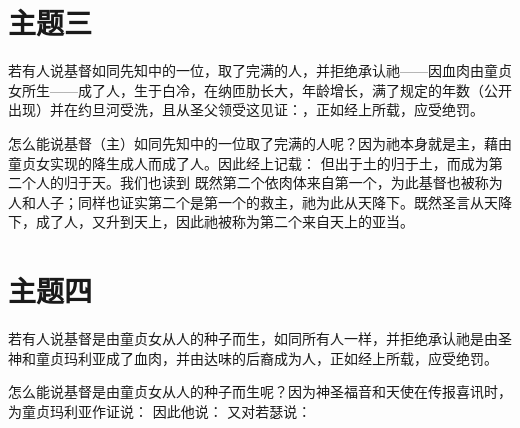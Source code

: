 
\section{主题三}

若有人说基督如同先知中的一位，取了完满的人，并拒绝承认祂——因血肉由童贞女所生——成了人，生于白冷，在纳匝肋长大，年龄增长，满了规定的年数（公开出现）并在约旦河受洗，且从圣父领受这见证：，正如经上所载，应受绝罚。\par

\par

怎么能说基督（主）如同先知中的一位取了完满的人呢？因为祂本身就是主，藉由童贞女实现的降生成人而成了人。因此经上记载： 但出于土的归于土，而成为第二个人的归于天。我们也读到 既然第二个依肉体来自第一个，为此基督也被称为人和人子；同样也证实第二个是第一个的救主，祂为此从天降下。既然圣言从天降下，成了人，又升到天上，因此祂被称为第二个来自天上的亚当。\par


\section{主题四}

若有人说基督是由童贞女从人的种子而生，如同所有人一样，并拒绝承认祂是由圣神和童贞玛利亚成了血肉，并由达味的后裔成为人，正如经上所载，应受绝罚。\par

\par

怎么能说基督是由童贞女从人的种子而生呢？因为神圣福音和天使在传报喜讯时，为童贞玛利亚作证说： 因此他说： 又对若瑟说：\par


